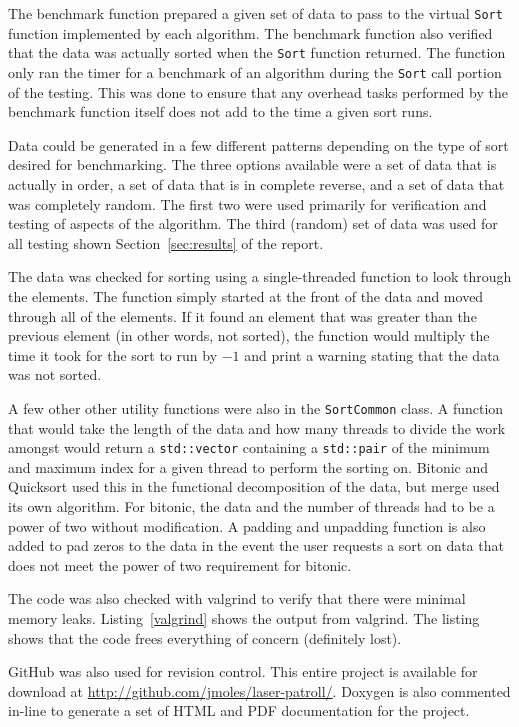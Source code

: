 \documentclass[journal]{IEEEtran}
\newcommand{\bashout}[2]{
\begin{figure}

\end{figure}
}
\begin{document}
The benchmark function prepared a given set of data to pass to the virtual \texttt{Sort} function implemented by each algorithm. The benchmark function also verified that the data was actually sorted when the \texttt{Sort} function returned. The function only ran the timer for a benchmark of an algorithm during the \texttt{Sort} call portion of the testing. This was done to ensure that any overhead tasks performed by the benchmark function itself does not add to the time a given sort runs.

Data could be generated in a few different patterns depending on the type of sort desired for benchmarking. The three options available were a set of data that is actually in order, a set of data that is in complete reverse, and a set of data that was completely random. The first two were used primarily for verification and testing of aspects of the algorithm. The third (random) set of data was used for all testing shown Section~\ref{sec:results} of the report.

The data was checked for sorting using a single-threaded function to look through the elements. The function simply started at the front of the data and moved through all of the elements. If it found an element that was greater than the previous element (in other words, not sorted), the function would multiply the time it took for the sort to run by $-1$ and print a warning stating that the data was not sorted.

A few other other utility functions were also in the \texttt{SortCommon} class. A function that would take the length of the data and how many threads to divide the work amongst would return a \texttt{std::vector} containing a \texttt{std::pair} of the minimum and maximum index for a given thread to perform the sorting on. Bitonic and Quicksort used this in the functional decomposition of the data, but merge used its own algorithm. For bitonic, the data and the number of threads had to be a power of two without modification. A padding and unpadding function is also added to pad zeros to the data in the event the user requests a sort on data that does not meet the power of two requirement for bitonic.

The code was also checked with valgrind to verify that there were minimal memory leaks. Listing~\ref{valgrind} shows the output from valgrind. The listing shows that the code frees everything of concern (definitely lost).

\bashout{valgrind}{Valgrind Output}

GitHub was also used for revision control. This entire project is available for download at \url{http://github.com/jmoles/laser-patroll/}. Doxygen is also commented in-line to generate a set of HTML and PDF documentation for the project.
\end{document}
